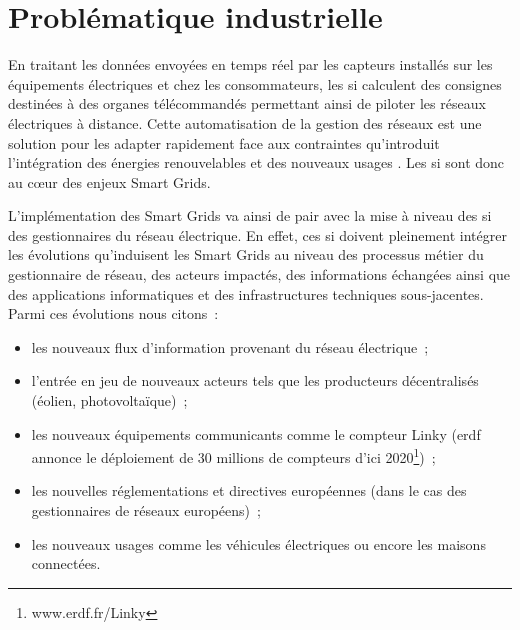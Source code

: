 \section{Problématique industrielle}


En traitant les données envoyées en temps réel par les capteurs installés sur 
les équipements électriques et chez les consommateurs, les \gls{si} calculent 
des consignes destinées à des organes télécommandés permettant ainsi de piloter 
les 
réseaux électriques à distance. 
Cette automatisation de la gestion des réseaux est une solution pour les adapter 
rapidement face aux contraintes qu'introduit l'intégration des énergies 
renouvelables et des nouveaux usages \cite{cre}. Les \gls{si} sont donc au cœur 
des 
enjeux Smart Grids.  

L'implémentation des Smart Grids va ainsi de pair avec la mise à niveau des 
\gls{si} des gestionnaires du réseau électrique. En effet, ces \gls{si} doivent 
pleinement intégrer les évolutions qu'induisent les Smart Grids au niveau des 
processus 
métier du gestionnaire de réseau, des acteurs impactés, des informations 
échangées ainsi que des applications informatiques et des infrastructures 
techniques sous-jacentes. Parmi ces évolutions nous citons~:

\begin{itemize}
    \item les nouveaux flux d'information provenant du réseau électrique~;

    \item l'entrée en jeu de nouveaux acteurs tels que les producteurs
    décentralisés (éolien, photovoltaïque)~;

    \item les nouveaux équipements communicants comme le compteur Linky 
(\gls{erdf} 
    annonce le déploiement de 30 millions de compteurs d'ici 
    2020\footnote{www.erdf.fr/Linky})~;

    \item les nouvelles réglementations et directives européennes (dans le cas 
    des gestionnaires de réseaux européens)~;

    \item les nouveaux usages comme les véhicules électriques ou encore les 
    maisons connectées.
\end{itemize}


